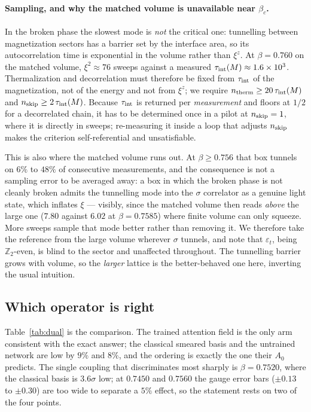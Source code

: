 \documentclass[aps,prl,reprint,superscriptaddress,nofootinbib]{revtex4-2}
\newcommand{\Zt}{\mathbb{Z}_2}
\begin{document}
\paragraph{Sampling, and why the matched volume is unavailable near $\beta_c$.}
In the broken phase the slowest mode is \emph{not} the critical one: tunnelling
between magnetization sectors has a barrier set by the interface area, so its
autocorrelation time is exponential in the volume rather than $\xi^z$. At
$\beta=0.760$ on the matched volume, $\xi^2\approx76$ sweeps against a measured
$\tau_{\rm int}(M)\approx1.6\times10^3$. Thermalization and decorrelation must
therefore be fixed from $\tau_{\rm int}$ of the magnetization, not of the energy
and not from $\xi^z$; we require $n_{\rm therm}\ge20\,\tau_{\rm int}(M)$ and
$n_{\rm skip}\ge2\,\tau_{\rm int}(M)$. Because $\tau_{\rm int}$ is returned per
\emph{measurement} and floors at $1/2$ for a decorrelated chain, it has to be
determined once in a pilot at $n_{\rm skip}=1$, where it is directly in sweeps;
re-measuring it inside a loop that adjusts $n_{\rm skip}$ makes the criterion
self-referential and unsatisfiable.

This is also where the matched volume runs out. At $\beta\ge0.756$ that box
tunnels on $6\%$ to $48\%$ of consecutive measurements, and the consequence is
not a sampling error to be averaged away: a box in which the broken phase is not
cleanly broken admits the tunnelling mode into the $\sigma$ correlator as a
genuine light state, which inflates $\xi$ --- visibly, since the matched volume
then reads \emph{above} the large one ($7.80$ against $6.02$ at $\beta=0.7585$)
where finite volume can only squeeze. More sweeps sample that mode better rather
than removing it. We therefore take the reference from the large volume wherever
$\sigma$ tunnels, and note that $\varepsilon_t$, being $\Zt$-even, is blind to
the sector and unaffected throughout. The tunnelling barrier grows with volume,
so the \emph{larger} lattice is the better-behaved one here, inverting the usual
intuition.

\subsection{Which operator is right}

Table~\ref{tab:dual} is the comparison. The trained attention field is the only
arm consistent with the exact answer; the classical smeared basis and the
untrained network are low by $9\%$ and $8\%$, and the ordering is exactly the one
their $A_0$ predicts. The single coupling that discriminates most sharply is
$\beta=0.7520$, where the classical basis is $3.6\sigma$ low; at $0.7450$ and
$0.7560$ the gauge error bars ($\pm0.13$ to $\pm0.30$) are too wide to separate a
$5\%$ effect, so the statement rests on two of the four points.
\end{document}
